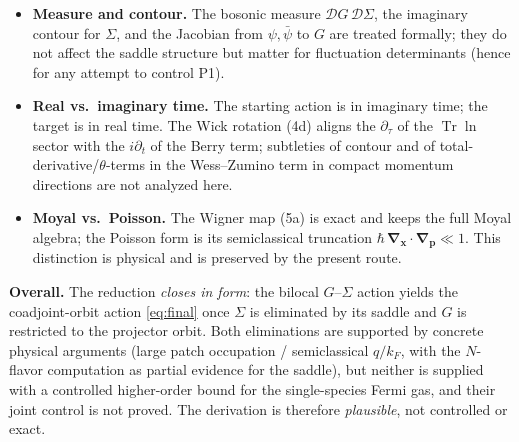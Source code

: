 \documentclass[11pt]{article}
\theoremstyle{remark}
\begin{document}
\begin{itemize}
\item \textbf{Measure and contour.} The bosonic measure $\mathcal{D}G\,\mathcal{D}\Sigma$,
the imaginary contour for $\Sigma$, and the Jacobian from $\psi,\bar\psi$ to $G$ are treated
formally; they do not affect the saddle structure but matter for fluctuation determinants
(hence for any attempt to control P1).

\item \textbf{Real vs.\ imaginary time.} The starting action is in imaginary time; the target
is in real time. The Wick rotation (4d) aligns the $\partial_\tau$ of the
$\operatorname{Tr}\ln$ sector with the $i\partial_t$ of the Berry term; subtleties of contour
and of total-derivative/$\theta$-terms in the Wess--Zumino term in compact momentum
directions are not analyzed here.

\item \textbf{Moyal vs.\ Poisson.} The Wigner map (5a) is exact and keeps the full Moyal
algebra; the Poisson form is its semiclassical truncation
$\hbar\,\boldsymbol{\nabla}_{\boldsymbol{x}}\!\cdot\!\boldsymbol{\nabla}_{\boldsymbol{p}}\ll1$.
This distinction is physical and is preserved by the present route.
\end{itemize}

\noindent\textbf{Overall.} The reduction \emph{closes in form}: the bilocal $G$--$\Sigma$
action yields the coadjoint-orbit action \eqref{eq:final} once $\Sigma$ is eliminated by its
saddle and $G$ is restricted to the projector orbit. Both eliminations are supported by
concrete physical arguments (large patch occupation / semiclassical $q/k_F$, with the
$N$-flavor computation as partial evidence for the saddle), but neither is supplied with a
controlled higher-order bound for the single-species Fermi gas, and their joint control is
not proved. The derivation is therefore \emph{plausible}, not controlled or exact.
\end{document}
